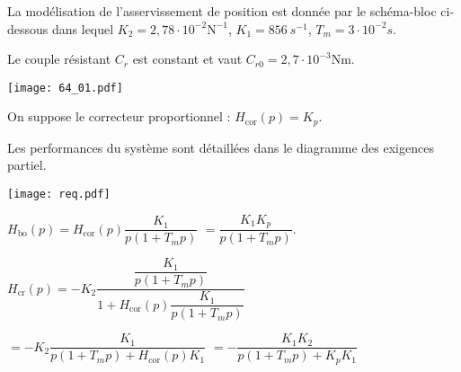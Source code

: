 \normaltrue \difficilefalse \tdifficilefalse
\correctionfalse


\setcounter{question}{0}%



\ifprof
\else
La modélisation de l'asservissement de position est donnée par le schéma-bloc ci-dessous dans lequel $K_2 = 2,78 \cdot 10^{-2} \text{N}^{-1}$, $K_1 = \SI{856}{s^{-1}}$, $T_m= 3\cdot  10^{-2} s$.

Le couple résistant $C_r$ est constant et vaut $C_{r0} = 2,7 \cdot 10^{-3} \text{Nm}$.


\begin{marginfigure}
\texttt{[image: 64\_01.pdf]}
\end{marginfigure}

On suppose le correcteur proportionnel : $H_{\text{cor}}(p)=K_p$.

Les performances du système sont détaillées dans le diagramme des exigences partiel.%


\begin{marginfigure}
\texttt{[image: req.pdf]}
\end{marginfigure}



\fi
{}
\ifprof

$H_{\text{bo}}(p) = H_{\text{cor}}(p) \dfrac{K_1}{p\left(1+T_m p\right)}$ $=  \dfrac{K_1 K_p}{p\left(1+T_m p\right)}$.

$H_{\text{cr}}(p)= -K_2\dfrac{\dfrac{K_1}{p\left(1+T_m p\right)}}{1+H_{\text{cor}}(p) \dfrac{K_1}{p\left(1+T_m p\right)}}$

$= -K_2\dfrac{K_1}{p\left(1+T_m p\right)+H_{\text{cor}}(p) K_1}$
$= -\dfrac{K_1K_2}{p\left(1+T_m p\right)+K_p K_1}$
\else
\fi

